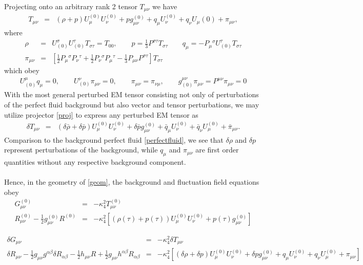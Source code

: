 \documentclass[10pt,letterpaper]{article}
\numberwithin{equation}{section}
\begin{document}
Projecting onto an arbitrary rank 2 tensor $T_{\mu\nu}$ we have
\begin{eqnarray}
T_{\mu\nu} &=& (\rho + p)U_\mu^{(0)} U_\nu^{(0)} + p g_{\mu\nu}^{(0)} + q_\mu U_\nu^{(0)} + q_\nu U_\mu{(0)} + \pi_{\mu\nu},
\end{eqnarray}
where
\begin{eqnarray}
\rho&=&U^\sigma_{(0)}U^\tau_{(0)}T_{\sigma\tau} = T_{00},\qquad p = \frac13 P^{\sigma\tau}T_{\sigma\tau}\qquad q_\mu = -P_\mu{}^\sigma U^\tau_{(0)} T_{\sigma\tau}
\nonumber\\
\pi_{\mu\nu} &=&\left[\frac12 P_{\mu}{}^\sigma P_\nu{}^\tau + \frac12 P_\nu{}^\sigma P_\mu{}^\tau -\frac13 P_{\mu\nu}P^{\sigma\tau}\right]T_{\sigma\tau}
\end{eqnarray}
which obey
\begin{eqnarray}
U^\mu_{(0)} q_\mu = 0,\qquad U^\nu_{(0)} \pi_{\mu\nu} = 0,\qquad \pi_{\mu\nu} = \pi_{\nu\mu},\qquad g^{\mu\nu}_{(0)}\pi_{\mu\nu} = P^{\mu\nu}\pi_{\mu\nu}= 0
\end{eqnarray}
With the most general perturbed EM tensor consisting not only of perturbations of the perfect fluid background but also vector and tensor perturbations, we may utilize projector \eqref{proj} to express any perturbed EM tensor as
\begin{eqnarray}
\delta T_{\mu\nu} &=& (\delta\bar\rho + \delta  \bar p)U_\mu^{(0)} U_\nu^{(0)} + \delta \bar p g_{\mu\nu}^{(0)} + \bar q_\mu U_\nu^{(0)} + \bar q_\nu U_\mu^{(0)} + \bar \pi_{\mu\nu}.
\end{eqnarray}
Comparison to the background perfect fluid \eqref{perfectfluid}, we see that $\delta \rho$ and $\delta p$ represent perturbations of the background, while $q_\mu$ and $\pi_{\mu\nu}$ are first order quantities without any respective background component. 
\\ \\
Hence, in the geometry of \eqref{geom}, the background and fluctuation field equations obey
\begin{eqnarray}
 G_{\mu\nu}^{(0)}&=& -\kappa^2_4  T_{\mu\nu}^{(0)}
\nonumber\\
R_{\mu\nu}^{(0)}-\frac12 g_{\mu\nu}^{(0)} R^{(0)} &=& -\kappa^2_4 \left[  (\rho(\tau)+p(\tau))U^{(0)}_\mu U^{(0)}_\nu + p(\tau)g_{\mu\nu}^{(0)}\right]
\label{gt}
\end{eqnarray}

\begin{eqnarray}
\delta G_{\mu\nu} &=& -\kappa^2_4 \delta T_{\mu\nu}
\nonumber\\
\delta R_{\mu\nu} - \frac12 g_{\mu\nu} g^{\alpha\beta}\delta R_{\alpha\beta} - \frac12 h_{\mu\nu} R
+ \frac12 g_{\mu\nu}h^{\alpha\beta} R_{\alpha\beta} &=&
-\kappa_4^2\left[ (\delta\rho + \delta  p)U_\mu^{(0)} U_\nu^{(0)} + \delta p g_{\mu\nu}^{(0)} + q_\mu U_\nu^{(0)} + q_\nu U_\mu^{(0)} + \pi_{\mu\nu}\right]
\nonumber\\
\label{dgdt}
\end{eqnarray}
%
%
\end{document}
